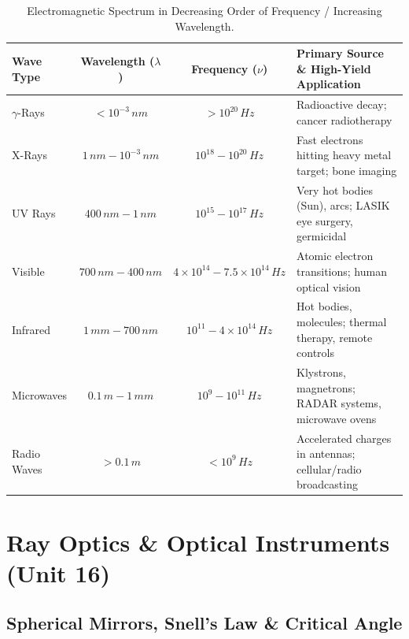 \documentclass[10pt,twoside,openright]{book}
\begin{document}
\begin{table}[htbp]
\centering
\small
\renewcommand{\arraystretch}{1.2}
\begin{tabularx}{\textwidth}{L c c L}
\toprule
\textbf{Wave Type} & \textbf{Wavelength ($\lambda$)} & \textbf{Frequency ($\nu$)} & \textbf{Primary Source \& High-Yield Application} \\
\midrule
$\gamma$-Rays & $< 10^{-3}\,\si{nm}$ & $> 10^{20}\,\si{Hz}$ & Radioactive decay; cancer radiotherapy \\
X-Rays & $1\,\si{nm} - 10^{-3}\,\si{nm}$ & $10^{18} - 10^{20}\,\si{Hz}$ & Fast electrons hitting heavy metal target; bone imaging \\
UV Rays & $400\,\si{nm} - 1\,\si{nm}$ & $10^{15} - 10^{17}\,\si{Hz}$ & Very hot bodies (Sun), arcs; LASIK eye surgery, germicidal \\
Visible & $700\,\si{nm} - 400\,\si{nm}$ & $4\times 10^{14} - 7.5\times 10^{14}\,\si{Hz}$ & Atomic electron transitions; human optical vision \\
Infrared & $1\,\si{mm} - 700\,\si{nm}$ & $10^{11} - 4\times 10^{14}\,\si{Hz}$ & Hot bodies, molecules; thermal therapy, remote controls \\
Microwaves & $0.1\,\si{m} - 1\,\si{mm}$ & $10^9 - 10^{11}\,\si{Hz}$ & Klystrons, magnetrons; RADAR systems, microwave ovens \\
Radio Waves & $> 0.1\,\si{m}$ & $< 10^9\,\si{Hz}$ & Accelerated charges in antennas; cellular/radio broadcasting \\
\bottomrule
\end{tabularx}
\caption{Electromagnetic Spectrum in Decreasing Order of Frequency / Increasing Wavelength.}
\end{table}

\section{Ray Optics \& Optical Instruments (Unit 16)}

\subsection{Spherical Mirrors, Snell's Law \& Critical Angle}
\end{document}
